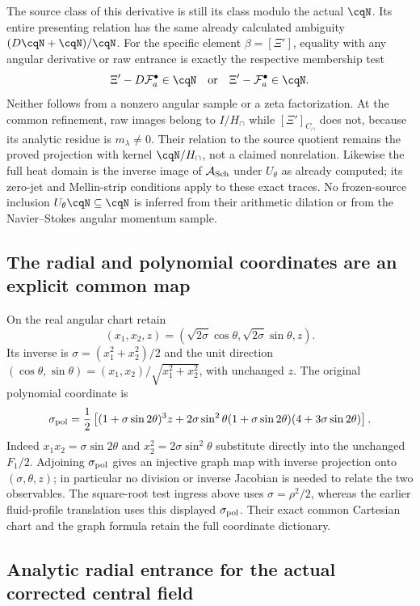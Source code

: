 The source class of this derivative is still its class modulo
the actual $\cqN$. Its entire presenting relation has the same
already calculated ambiguity $(D\cqN+\cqN)/\cqN$.
For the specific element $\beta=[\Xi']$, equality with any
angular derivative or raw entrance is exactly the respective
membership test
\[
 \Xi'-D\mathcal F_a^\bullet\in\cqN
 \quad\text{or}\quad
 \Xi'-\mathcal F_a^\bullet\in\cqN.
\]
Neither follows from a nonzero angular sample or a zeta
factorization. At the common refinement, raw images belong to
$I/H_\cap$ while $[\Xi']_{C_\cap}$ does not, because its
analytic residue is $m_\lambda\ne0$. Their relation to the
source quotient remains the proved projection with kernel
$\cqN/H_\cap$, not a claimed nonrelation.
Likewise the full heat domain is the inverse image of
$\mathcal A_{\rm Sch}$ under $U_\theta$ as already computed;
its zero-jet and Mellin-strip conditions apply to these exact
traces. No frozen-source inclusion $U_\theta\cqN\subseteq\cqN$
is inferred from their arithmetic dilation or from the
Navier--Stokes angular momentum sample.

\subsection{The radial and polynomial coordinates are an explicit common map}

On the real angular chart retain
\[
 (x_1,x_2,z)
   =(\sqrt{2\sigma}\cos\theta,\sqrt{2\sigma}\sin\theta,z).
\]
Its inverse is $\sigma=(x_1^2+x_2^2)/2$ and the unit direction
$(\cos\theta,\sin\theta)=(x_1,x_2)/\sqrt{x_1^2+x_2^2}$,
with unchanged $z$. The original polynomial coordinate is
\[
 \sigma_{\rm pol}=\frac12\left[
 (1+\sigma\sin2\theta)^3z+
 2\sigma\sin^2\theta(1+\sigma\sin2\theta)
                        (4+3\sigma\sin2\theta)\right].
\]
Indeed $x_1x_2=\sigma\sin2\theta$ and
$x_2^2=2\sigma\sin^2\theta$ substitute directly into the
unchanged $F_1/2$. Adjoining $\sigma_{\rm pol}$ gives an
injective graph map with inverse projection onto
$(\sigma,\theta,z)$; in particular no division or inverse
Jacobian is needed to relate the two observables. The
square-root test ingress above uses $\sigma=\rho^2/2$, whereas
the earlier fluid-profile translation uses this displayed
$\sigma_{\rm pol}$. Their exact common Cartesian chart and
the graph formula retain the full coordinate dictionary.

\subsection{Analytic radial entrance for the actual corrected central field}
\label{sec:cq-actual-angular-analytic}

